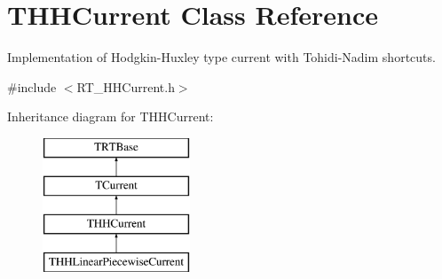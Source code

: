 \hypertarget{class_t_h_h_current}{\section{T\+H\+H\+Current Class Reference}
\label{class_t_h_h_current}
}


Implementation of Hodgkin-\/\+Huxley type current with Tohidi-\/\+Nadim shortcuts.  




{\ttfamily \#include $<$R\+T\+\_\+\+H\+H\+Current.\+h$>$}

Inheritance diagram for T\+H\+H\+Current\+:\begin{figure}[H]
\begin{center}
\leavevmode
\includegraphics[height=4.000000cm]{class_t_h_h_current}
\end{center}
\end{figure}
